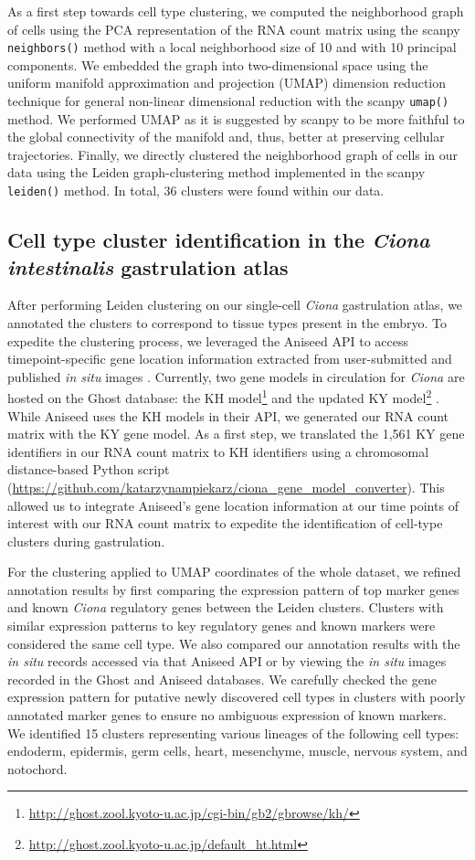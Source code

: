 As a first step towards cell type clustering, we computed the neighborhood graph of cells using the PCA representation of the RNA count matrix using the scanpy \verb|neighbors()| method with a local neighborhood size of 10 and with 10 principal components. We embedded the graph into two-dimensional space using the uniform manifold approximation and projection (UMAP) dimension reduction technique for general non-linear dimensional reduction with the scanpy \verb|umap()| method. We performed UMAP as it is suggested by scanpy to be more faithful to the global connectivity of the manifold and, thus, better at preserving cellular trajectories. Finally, we directly clustered the neighborhood graph of cells in our data using the Leiden graph-clustering method implemented in the scanpy \verb|leiden()| method. In total, 36 clusters were found within our data. 

\subsection{Cell type cluster identification in the \textit{Ciona intestinalis} gastrulation atlas}
After performing Leiden clustering on our single-cell \textit{Ciona} gastrulation atlas, we annotated the clusters to correspond to tissue types present in the embryo. To expedite the clustering process, we leveraged the Aniseed API to access timepoint-specific gene location information extracted from user-submitted and published \textit{in situ} images \cite{dardaillon2020}. Currently, two gene models in circulation for \textit{Ciona} are hosted on the Ghost database: the KH model\footnote{\url{http://ghost.zool.kyoto-u.ac.jp/cgi-bin/gb2/gbrowse/kh/}} and the updated KY model\footnote{\url{http://ghost.zool.kyoto-u.ac.jp/default_ht.html}} \cite{dehal2002,satou2019,imai2004}. While Aniseed uses the KH models in their API, we generated our RNA count matrix with the KY gene model. As a first step, we translated the 1,561 KY gene identifiers in our RNA count matrix to KH identifiers using a chromosomal distance-based Python script (\url{https://github.com/katarzynampiekarz/ciona_gene_model_converter}). This allowed us to integrate Aniseed's gene location information at our time points of interest with our RNA count matrix to expedite the identification of cell-type clusters during gastrulation. 

For the clustering applied to UMAP coordinates of the whole dataset, we refined annotation results by first comparing the expression pattern of top marker genes and known \textit{Ciona} regulatory genes between the Leiden clusters. Clusters with similar expression patterns to key regulatory genes and known markers were considered the same cell type. We also compared our annotation results with the \textit{in situ} records accessed via that Aniseed API or by viewing the \textit{in situ} images recorded in the Ghost and Aniseed databases. We carefully checked the gene expression pattern for putative newly discovered cell types in clusters with poorly annotated marker genes to ensure no ambiguous expression of known markers. We identified 15 clusters representing various lineages of the following cell types: endoderm, epidermis, germ cells, heart, mesenchyme, muscle, nervous system, and notochord.

